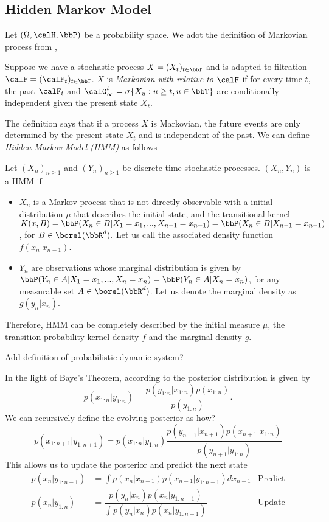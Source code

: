 \subsection{Hidden Markov Model}
Let $(\Omega,\calH,\bbP)$ be a probability space. We adot the definition of Markovian process from \cite{cinlar},
\begin{definition}
	Suppose we have a stochastic process $X= (X_t)_{t \in \bbT}$  and is adapted to filtration $\calF=(\calF_t)_{t \in \bbT}$.  $X$ is \textit{Markovian with relative to} $\calF$ if for every time $t$, the past $\calF_t$ and $\calG^t_\infty = \sigma\{X_u: u \geq t, u \in \bbT \}$ are conditionally independent given the present state $X_t$.
\end{definition}
The definition says that if a process $X$ is Markovian, the future events are only determined by the present state $X_t$ and is independent of the past. We can define \textit{Hidden Markov Model (HMM)} as follows \cite{}
\begin{definition}
	Let $(X_n)_{n \geq 1}$ and $(Y_n)_{n \geq 1}$ be discrete time stochastic processes. $(X_n, Y_n)$ is a HMM if
	\begin{itemize}
		\item $X_n$ is a Markov process that is not directly observable with a initial distribution $\mu$ that describes the initial state, and the transitional kernel $K(x,B)  = \bbP(X_n \in B |  X_1 = x_1, ..., X_{n-1} = x_{n-1}) = \bbP(X_n \in B | X_{n-1}=x_{n-1})$, for $B \in \borel(\bbR^d).$ Let us call the associated density function $f(x_n|x_{n-1})$.
		\item $Y_n$ are observations whose marginal distribution is given by $\bbP(Y_n \in A| X_1 = x_1, ..., X_n = x_n) = \bbP(Y_n \in A|X_n = x_n)$, for any measurable set $A \in \borel(\bbR^d)$. Let us denote the marginal density as $g(y_n|x_n)$.
	\end{itemize}
	
	Therefore, HMM can be completely described by the initial measure $\mu$, the transition probability kernel density $f$ and the marginal density $g$.
	
\end{definition}
Add definition of probabilistic dynamic system? 

In the light of Baye's Theorem, according to \cite{SMCinPrac} the posterior distribution is given by
\begin{equation}
p(x_{1:n}|y_{1:n}) = \dfrac{p(y_{1:n}|x_{1:n})p(x_{1:n})}{p(y_{1:n})}.
\end{equation}
We can recursively define the evolving posterior as how? 
\begin{equation}
p(x_{1:n+1}|y_{1:n+1}) = p(x_{1:n}|y_{1:n}) \dfrac{p(y_{n+1}|x_{n+1})p(x_{n+1}|x_{1:n})}{p(y_{n+1}|y_{1:n})}
\end{equation}
This allows us to update the posterior and predict the next state  
\begin{align}
p(x_n|y_{1:n-1}) &= \int p(x_{n}|x_{n-1})p(x_{n-1}|y_{1:n-1}) dx_{n-1} &\text{Predict}\\
p(x_n|y_{1:n}) &= \dfrac{p(y_n|x_n)p(x_n|y_{1:n-1})}{\int p(y_n|x_n)p(x_n|y_{1:n-1})} &\text{Update}
\end{align}

